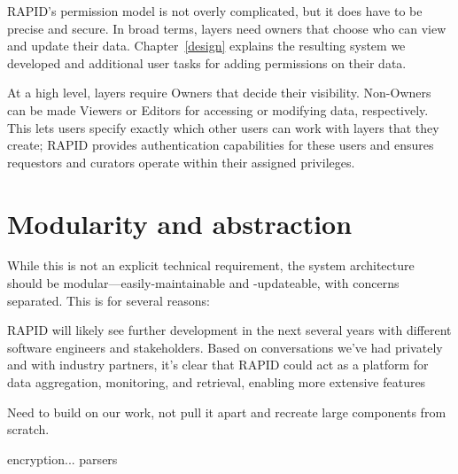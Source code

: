 RAPID's permission model is not overly complicated, but it does have to be precise and secure. In broad terms, layers need owners that choose who can view and update their data. Chapter~\ref{design} explains the resulting system we developed and additional user tasks for adding permissions on their data.

At a high level, layers require Owners that decide their visibility. Non-Owners can be made Viewers or Editors for accessing or modifying data, respectively. This lets users specify exactly which other users can work with layers that they create; RAPID provides authentication capabilities for these users and ensures requestors and curators operate within their assigned privileges.

\section{Modularity and abstraction}
While this is not an explicit technical requirement, the system architecture should be modular---easily-maintainable and -updateable, with concerns separated. This is for several reasons:

RAPID will likely see further development in the next several years with different software engineers and stakeholders. Based on conversations we've had privately and with industry partners, it's clear that RAPID could act as a platform for data aggregation, monitoring, and retrieval, enabling more extensive features

Need to build on our work, not pull it apart and recreate large components from scratch.


encryption... parsers
